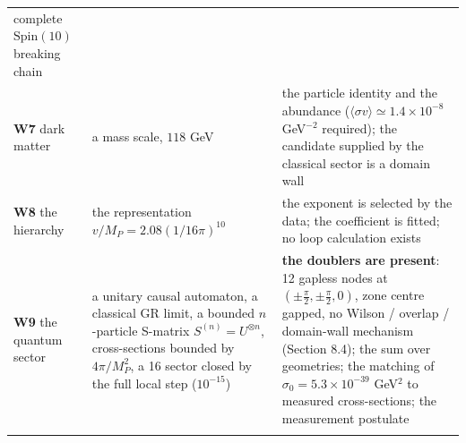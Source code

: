 \documentclass[aps,prd,twocolumn,amsmath,amssymb,superscriptaddress,nofootinbib,floatfix]{revtex4-2}
\newcommand{\grayhline}{\noalign{\vskip1pt{\color{black!30}\hrule height 0.3pt}\color{black}\vskip3pt}}
\begin{document}
\begin{table}[t]
\begin{tabular}{@{}p{}p{}p{}@{}}
complete \(\mathrm{Spin}(10)\) breaking chain \\ \addlinespace[2pt]
\grayhline
\textbf{W7} dark matter & a mass scale, \(118\) GeV & the particle identity and the abundance
(\(\langle\sigma v\rangle \simeq 1.4\times10^{-8}\) GeV\(^{-2}\)
required); the candidate supplied by the classical sector is a domain
wall \\ \addlinespace[2pt]
\grayhline
\textbf{W8} the hierarchy & the representation \(v/M_P = 2.08(1/16\pi)^{10}\) & the exponent is selected by the data; the coefficient is fitted; no loop
calculation exists \\ \addlinespace[2pt]
\grayhline
\textbf{W9} the quantum sector & a unitary causal automaton, a classical GR limit, a bounded
\(n\)-particle S-matrix \(S^{(n)} = U^{\otimes n}\), cross-sections
bounded by \(4\pi/M_P^2\), a 16 sector closed by the full local step
(\(10^{-15}\)) & \textbf{the doublers are present}: 12 gapless nodes at
\((\pm\tfrac\pi2,\pm\tfrac\pi2,0)\), zone centre gapped, no Wilson /
overlap / domain-wall mechanism (Section 8.4); the sum over geometries;
the matching of \(\sigma_0 = 5.3\times10^{-39}\) GeV\(^2\) to measured
cross-sections; the measurement postulate \\ \addlinespace[2pt] \bottomrule
\end{tabular}
\end{table}
\end{document}
